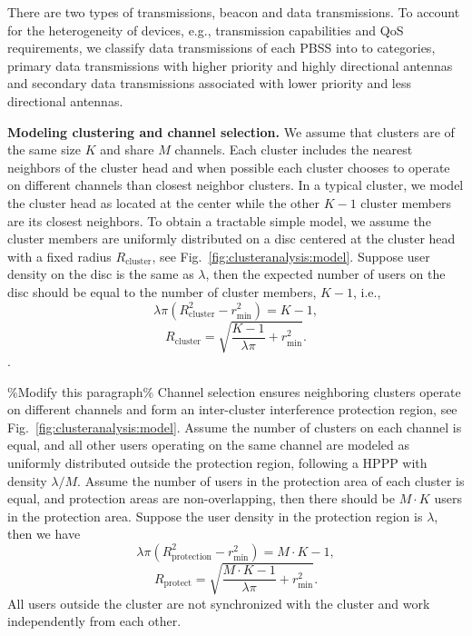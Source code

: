 \documentclass[10pt, conference, letterpaper]{IEEEtran}
\begin{document}
There are two types of transmissions, beacon and data transmissions. 
To account for the heterogeneity of devices, e.g., transmission capabilities and QoS requirements, we classify data transmissions of each PBSS into to categories, primary data transmissions with higher priority and highly directional antennas and secondary data transmissions associated with lower priority and less directional antennas. 


\textbf{Modeling clustering and channel selection.}
We assume that clusters are of the same size $K$ and share $M$ channels. Each cluster includes the nearest neighbors of the cluster head and when possible each cluster chooses to operate on different channels than closest neighbor clusters.
In a typical cluster, we model the cluster head as located at the center while the other $K-1$ cluster members are its closest neighbors.
To obtain a tractable simple model, we assume the cluster members are uniformly distributed on a disc centered at the cluster head with a fixed radius $R_{\mathrm{cluster}}$, see Fig.~\ref{fig:clusteranalysis:model}. 
Suppose user density on the disc is the same as $\lambda$, then the expected number of users on the disc should be equal to the number of cluster members, $K - 1$, i.e., 
\begin{equation*}
\lambda \pi (R_{\mathrm{cluster}}^2 - r_{\min}^2) = K - 1,
\end{equation*}
\begin{equation*}
R_{\mathrm{cluster}} = \sqrt{\frac{K - 1}{\lambda\pi}+r_{\min}^2}.
\end{equation*}.

\%Modify this paragraph\%
Channel selection ensures neighboring clusters operate on different channels and form an inter-cluster interference protection region, see Fig.~\ref{fig:clusteranalysis:model}.
Assume the number of clusters on each channel is equal, and all other users operating on the same channel are modeled as uniformly distributed outside the protection region, following a HPPP with density $\lambda/M$.
Assume the number of users in the protection area of each cluster is equal, and protection areas are non-overlapping, then there should be $M\cdot K$ users in the protection area. 
Suppose the user density in the protection region is $\lambda$, then we have 
\begin{equation*}
\lambda \pi (R_{\mathrm{protection}}^2 - r_{\min}^2) = M\cdot K - 1,
\end{equation*}
\begin{equation*}
R_{\mathrm{protect}} = \sqrt{\frac{M\cdot K - 1}{\lambda \pi} + r_{\min}^2}.
\end{equation*}
All users outside the cluster are not synchronized with the cluster and work independently from each other.  
\end{document}
